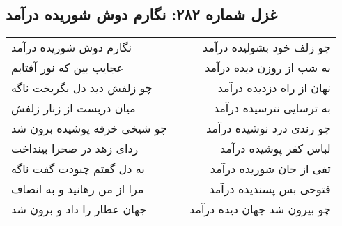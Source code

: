 \begin{center}
\section*{غزل شماره ۲۸۲: نگارم دوش شوریده درآمد}
\label{sec:282}
\begin{longtable}{l p{0.5cm} r}
نگارم دوش شوریده درآمد
&&
چو زلف خود بشولیده درآمد
\\
عجایب بین که نور آفتابم
&&
به شب از روزن دیده درآمد
\\
چو زلفش دید دل بگریخت ناگه
&&
نهان از راه دزدیده درآمد
\\
میان دربست از زنار زلفش
&&
به ترسایی نترسیده درآمد
\\
چو شیخی خرقه پوشیده برون شد
&&
چو رندی درد نوشیده درآمد
\\
ردای زهد در صحرا بینداخت
&&
لباس کفر پوشیده درآمد
\\
به دل گفتم چبودت گفت ناگه
&&
تفی از جان شوریده درآمد
\\
مرا از من رهانید و به انصاف
&&
فتوحی بس پسندیده درآمد
\\
جهان عطار را داد و برون شد
&&
چو بیرون شد جهان دیده درآمد
\\
\end{longtable}
\end{center}
